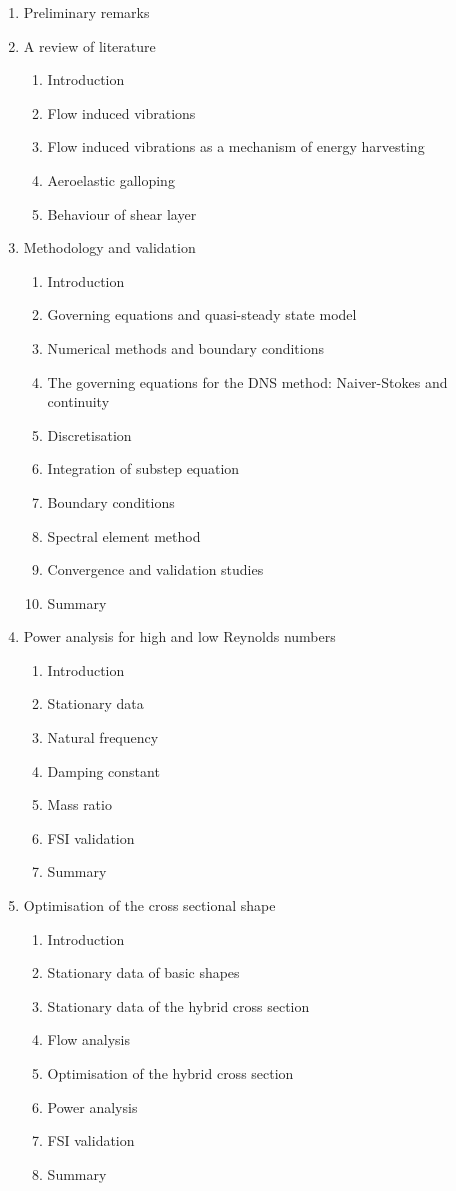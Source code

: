 \documentclass{article}
\begin{document}
\begin{enumerate}
\item Preliminary remarks 
\item A review of literature
\begin{enumerate}[i]
\item Introduction
\item Flow induced vibrations 
\item Flow induced vibrations as a mechanism of energy harvesting
\item Aeroelastic galloping
\item Behaviour of shear layer 
\end{enumerate}
\item Methodology and validation
\begin{enumerate}[i]
\item Introduction
\item Governing equations and quasi-steady state model 
\item Numerical methods and boundary conditions 
\item The governing equations for the DNS method: Naiver-Stokes and continuity  
\item Discretisation  
\item Integration of substep equation 
\item Boundary conditions 
\item Spectral element method
\item Convergence and validation studies 
\item Summary
\end{enumerate}
\item Power analysis for high and low Reynolds numbers
\begin{enumerate}[i]
\item Introduction 
\item Stationary data 
\item Natural frequency 
\item Damping constant 
\item Mass ratio
\item FSI validation 
\item Summary 
\end{enumerate}

\item Optimisation of the cross sectional shape 
\begin{enumerate}[i]
\item Introduction 
\item Stationary data of basic shapes  
\item Stationary data of the hybrid cross section
\item Flow analysis  
\item Optimisation of the hybrid cross section 
\item Power analysis 
\item FSI validation
\item Summary 
\end{enumerate}


\end{enumerate}
\end{document}
